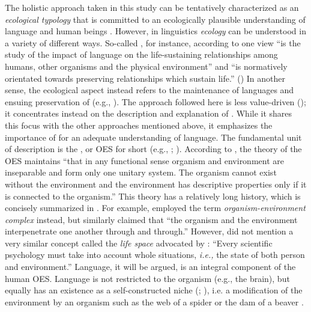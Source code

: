 The holistic approach taken in this study can be tentatively characterized as an \textit{ecological typology} that is committed to an ecologically plausible understanding of language and human beings \citep[186]{Hölzl2015d}. However, in linguistics \textit{ecology} can be understood in a variety of different ways. So-called \textit{}, for instance, according to one view “is the study of the impact of language on the life-sustaining relationships among humans, other organisms and the physical environment” and “is normatively orientated towards preserving relationships which sustain life.” (\citealt[105]{AlexanderStibbe2014}) In another sense, the ecological aspect instead refers to the maintenance of languages and ensuing preservation of  (e.g., \citealt{Mühlhäusler1992}). The approach followed here is less value-driven (\citealt[173f.]{Hölzl2015d}); it concentrates instead on the description and explanation of . While it shares this focus with the other approaches mentioned above, it emphasizes the importance of  for an adequate understanding of language. The fundamental unit of description is the \textit{}, or OES for short (e.g., \citealt{Turvey2009}; \citealt{Welsch2012}). According to \cite[329]{Järvilehto1998}, the theory of the OES maintains “that in any functional sense organism and environment are inseparable and form only one unitary system. The organism cannot exist without the environment and the environment has descriptive properties only if it is connected to the organism.” This theory has a relatively long history, which is concisely summarized in \citet{Järvilehto2009}. For example, \cite[233]{Sumner1922} employed the term \textit{organism-environment} \textit{complex} instead, but similarly claimed that “the organism and the environment interpenetrate one another through and through.” However, \citet{Järvilehto2009} did not mention a very similar concept called the \textit{life space} advocated by \citet[12]{Lewin1936}: “Every scientific psychology must take into account whole situations, \textit{i.e.,} the state of both person and environment.” Language, it will be argued, is an integral component of the human OES. Language is not restricted to the organism (e.g., the brain), but equally has an existence as a self-constructed niche (\citealt{Odling-SmeeLaland2009}; \citealt{Sinha2013}), i.e. a modification of the environment by an organism such as the web of a spider or the dam of a beaver \citep[5]{Odling-Smeeetal2013}.

